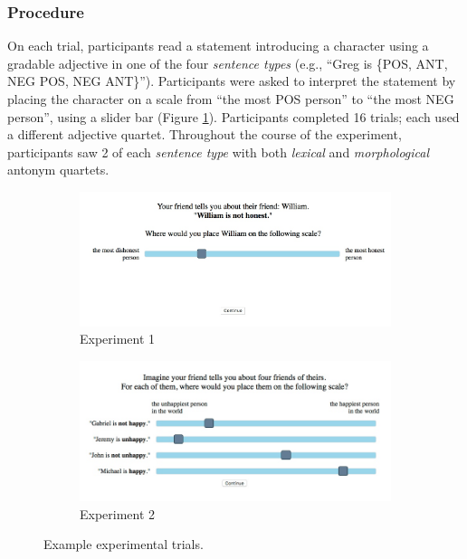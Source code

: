 \documentclass[10pt,letterpaper]{article}
\newcommand{\figref}[1]{Figure \ref{#1}}
\begin{document}
\subsubsection{Procedure}

On each trial, participants read a statement introducing a character using a gradable adjective in one of the four \emph{sentence types} (e.g., ``Greg is \{POS, ANT, NEG POS, NEG ANT\}'').
Participants were asked to interpret the statement by placing the character on a scale from ``the most POS person'' to ``the most NEG person'', using a slider bar (\figref{fig:expt1}).
Participants completed 16 trials; each used a different adjective quartet.
Throughout the course of the experiment, participants saw 2 of each \emph{sentence type} with both \emph{lexical} and \emph{morphological} antonym quartets. 

\begin{figure}[t]
	\centering
	\begin{subfigure}[t]{0.5\textwidth}
		\centering
		\includegraphics[width=\textwidth]{expt1.jpeg}
		\caption{Experiment 1}\label{fig:expt1}		
	\end{subfigure}%
	\begin{subfigure}[t]{0.5\textwidth}
		\centering
		\includegraphics[width=\textwidth]{expt2.jpeg}
		\caption{Experiment 2}\label{fig:expt2}
	\end{subfigure}
	\caption{Example experimental trials.}\label{fig:expt-procedure}
\end{figure}
\end{document}
